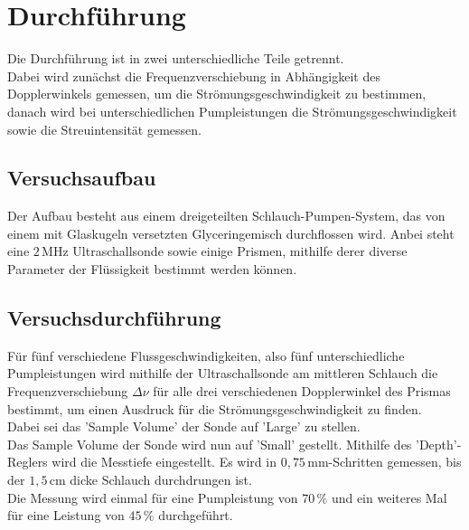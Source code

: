 \section{Durchführung}
\label{sec:Durchführung}

Die Durchführung ist in zwei unterschiedliche
Teile getrennt. \\

Dabei wird zunächst die Frequenzverschiebung in Abhängigkeit
des Dopplerwinkels gemessen, um die Strömungsgeschwindigkeit
zu bestimmen, danach wird bei unterschiedlichen Pumpleistungen 
die Strömungsgeschwindigkeit sowie die Streuintensität gemessen.

\subsection{Versuchsaufbau}

Der Aufbau besteht aus einem dreigeteilten Schlauch-Pumpen-System, das von einem
mit Glaskugeln versetzten Glyceringemisch durchflossen wird.
Anbei steht eine $2 \, \unit{\mega\hertz}$ Ultraschallsonde sowie einige Prismen, mithilfe
derer diverse Parameter der Flüssigkeit bestimmt werden können.


\subsection{Versuchsdurchführung}

Für fünf verschiedene Flussgeschwindigkeiten, also fünf unterschiedliche
Pumpleistungen wird mithilfe der Ultraschallsonde am mittleren
Schlauch die Frequenzverschiebung $\Delta \nu$ für alle drei verschiedenen
Dopplerwinkel des Prismas bestimmt, um einen Ausdruck für die 
Strömungsgeschwindigkeit zu finden. \\

Dabei sei das 'Sample Volume' der Sonde auf 'Large' zu stellen. \\

Das Sample Volume der Sonde wird nun auf 'Small' gestellt.
Mithilfe des 'Depth'-Reglers wird die Messtiefe eingestellt.
Es wird in $0,75 \,\unit{\milli\meter}$-Schritten gemessen, bis der
$1,5 \,\unit{\centi\meter}$ dicke Schlauch durchdrungen ist. \\

Die Messung wird einmal für eine Pumpleistung von $70 \,\%$ und
ein weiteres Mal für eine Leistung von $45 \,\%$ durchgeführt.
